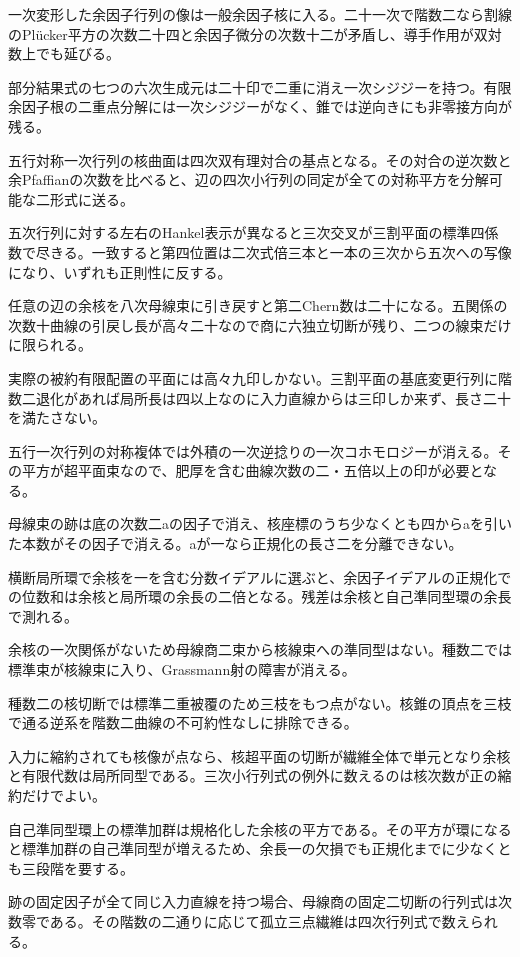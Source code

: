 \documentclass[11pt,a4paper]{ltjsarticle}
\begin{document}
一次変形した余因子行列の像は一般余因子核に入る。二十一次で階数二なら割線のPlücker平方の次数二十四と余因子微分の次数十二が矛盾し、導手作用が双対数上でも延びる。

部分結果式の七つの六次生成元は二十印で二重に消え一次シジジーを持つ。有限余因子根の二重点分解には一次シジジーがなく、錐では逆向きにも非零接方向が残る。

五行対称一次行列の核曲面は四次双有理対合の基点となる。その対合の逆次数と余Pfaffianの次数を比べると、辺の四次小行列の同定が全ての対称平方を分解可能な二形式に送る。

五次行列に対する左右のHankel表示が異なると三次交叉が三割平面の標準四係数で尽きる。一致すると第四位置は二次式倍三本と一本の三次から五次への写像になり、いずれも正則性に反する。

任意の辺の余核を八次母線束に引き戻すと第二Chern数は二十になる。五関係の次数十曲線の引戻し長が高々二十なので商に六独立切断が残り、二つの線束だけに限られる。

実際の被約有限配置の平面には高々九印しかない。三割平面の基底変更行列に階数二退化があれば局所長は四以上なのに入力直線からは三印しか来ず、長さ二十を満たさない。

五行一次行列の対称複体では外積の一次逆捻りの一次コホモロジーが消える。その平方が超平面束なので、肥厚を含む曲線次数の二・五倍以上の印が必要となる。

母線束の跡は底の次数二aの因子で消え、核座標のうち少なくとも四からaを引いた本数がその因子で消える。aが一なら正規化の長さ二を分離できない。

横断局所環で余核を一を含む分数イデアルに選ぶと、余因子イデアルの正規化での位数和は余核と局所環の余長の二倍となる。残差は余核と自己準同型環の余長で測れる。

余核の一次関係がないため母線商二束から核線束への準同型はない。種数二では標準束が核線束に入り、Grassmann射の障害が消える。

種数二の核切断では標準二重被覆のため三枝をもつ点がない。核錐の頂点を三枝で通る逆系を階数二曲線の不可約性なしに排除できる。

入力に縮約されても核像が点なら、核超平面の切断が繊維全体で単元となり余核と有限代数は局所同型である。三次小行列式の例外に数えるのは核次数が正の縮約だけでよい。

自己準同型環上の標準加群は規格化した余核の平方である。その平方が環になると標準加群の自己準同型が増えるため、余長一の欠損でも正規化までに少なくとも三段階を要する。

跡の固定因子が全て同じ入力直線を持つ場合、母線商の固定二切断の行列式は次数零である。その階数の二通りに応じて孤立三点繊維は四次行列式で数えられる。
\end{document}
